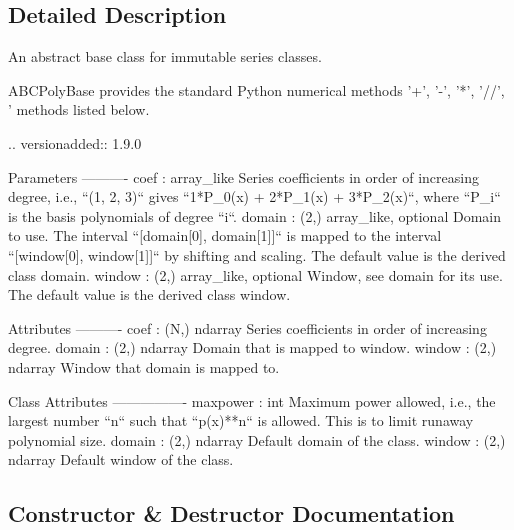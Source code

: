 \subsection{Detailed Description}
\begin{DoxyVerb}An abstract base class for immutable series classes.

ABCPolyBase provides the standard Python numerical methods
'+', '-', '*', '//', '%
methods listed below.

.. versionadded:: 1.9.0

Parameters
----------
coef : array_like
    Series coefficients in order of increasing degree, i.e.,
    ``(1, 2, 3)`` gives ``1*P_0(x) + 2*P_1(x) + 3*P_2(x)``, where
    ``P_i`` is the basis polynomials of degree ``i``.
domain : (2,) array_like, optional
    Domain to use. The interval ``[domain[0], domain[1]]`` is mapped
    to the interval ``[window[0], window[1]]`` by shifting and scaling.
    The default value is the derived class domain.
window : (2,) array_like, optional
    Window, see domain for its use. The default value is the
    derived class window.

Attributes
----------
coef : (N,) ndarray
    Series coefficients in order of increasing degree.
domain : (2,) ndarray
    Domain that is mapped to window.
window : (2,) ndarray
    Window that domain is mapped to.

Class Attributes
----------------
maxpower : int
    Maximum power allowed, i.e., the largest number ``n`` such that
    ``p(x)**n`` is allowed. This is to limit runaway polynomial size.
domain : (2,) ndarray
    Default domain of the class.
window : (2,) ndarray
    Default window of the class.\end{DoxyVerb}
 

\subsection{Constructor \& Destructor Documentation}
\mbox{\label{classnumpy_1_1polynomial_1_1__polybase_1_1ABCPolyBase_abe51e52103727401042c5ccf18cbc06c}} 
